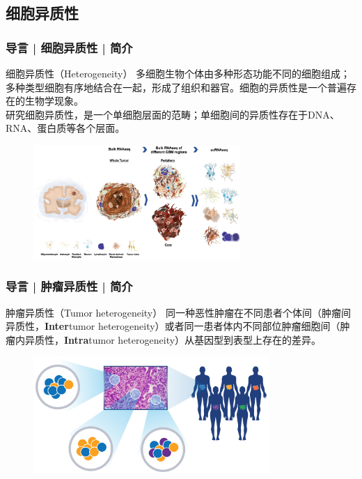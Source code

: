 \documentclass[11pt]{ctexbeamer}
\begin{document}
\subsection{细胞异质性}
\begin{frame}
  \frametitle{导言 | 细胞异质性 | 简介}
  \begin{block}{细胞异质性（Heterogeneity）}
    多细胞生物个体由多种形态功能不同的细胞组成；多种类型细胞有序地结合在一起，形成了组织和器官。细胞的异质性是一个普遍存在的生物学现象。\\
    研究细胞异质性，是一个单细胞层面的范畴；单细胞间的异质性存在于DNA、RNA、蛋白质等各个层面。
  \end{block}
  \begin{figure}
    \centering
    \includegraphics[width=0.7\textwidth]{cell_het.png}
  \end{figure}
\end{frame}
\begin{frame}
  \frametitle{导言 | 肿瘤异质性 | 简介}
  \begin{block}{肿瘤异质性（Tumor heterogeneity）}
    同一种恶性肿瘤在不同患者个体间（肿瘤间异质性，\textbf{Inter}tumor heterogeneity）或者同一患者体内不同部位肿瘤细胞间（肿瘤内异质性，\textbf{Intra}tumor heterogeneity）从基因型到表型上存在的差异。
  \end{block}
  \begin{figure}
    \centering
    \includegraphics[width=0.8\textwidth]{tumor_het_02.png}
  \end{figure}
\end{frame}
\end{document}
